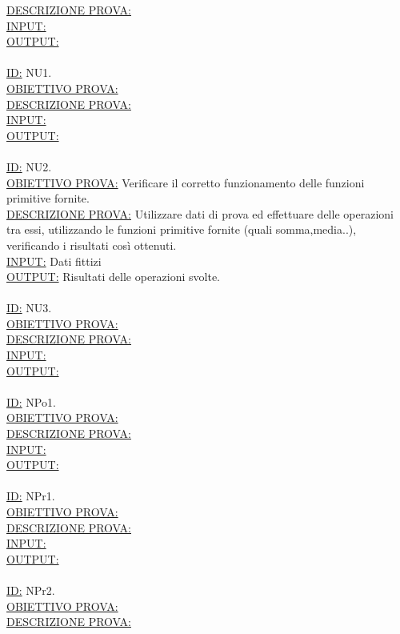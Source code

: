 \documentclass[11pt,titlepage,a4paper]{report}
\begin{document}
\underline{DESCRIZIONE PROVA:}  \\
\underline{INPUT:}  \\
\underline{OUTPUT:}  \\
\\
\underline{ID:} NU1.\\
\underline{OBIETTIVO PROVA:} \\
\underline{DESCRIZIONE PROVA:}  \\
\underline{INPUT:}  \\
\underline{OUTPUT:}  \\
\\
\underline{ID:} NU2.\\
\underline{OBIETTIVO PROVA:} Verificare il corretto funzionamento delle funzioni primitive fornite.\\
\underline{DESCRIZIONE PROVA:} Utilizzare dati di prova ed effettuare delle operazioni tra essi, utilizzando le funzioni primitive fornite (quali somma,media..), verificando i risultati cos\`i ottenuti. \\
\underline{INPUT:} Dati fittizi \\
\underline{OUTPUT:} Risultati delle operazioni svolte. \\
\\
\underline{ID:} NU3.\\
\underline{OBIETTIVO PROVA:} \\
\underline{DESCRIZIONE PROVA:}  \\
\underline{INPUT:}  \\
\underline{OUTPUT:}  \\
\\
\underline{ID:} NPo1.\\
\underline{OBIETTIVO PROVA:}  \\
\underline{DESCRIZIONE PROVA:}  \\
\underline{INPUT:}  \\
\underline{OUTPUT:}  \\
\\
\underline{ID:} NPr1.\\
\underline{OBIETTIVO PROVA:}  \\
\underline{DESCRIZIONE PROVA:}  \\
\underline{INPUT:}  \\
\underline{OUTPUT:}  \\
\\
\underline{ID:} NPr2.\\
\underline{OBIETTIVO PROVA:}  \\
\underline{DESCRIZIONE PROVA:}  \\
\end{document}
